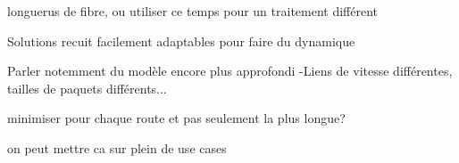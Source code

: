  longuerus de fibre, ou utiliser ce temps pour un traitement différent

Solutions recuit facilement adaptables pour faire du dynamique 

Parler notemment du modèle encore plus approfondi -Liens de vitesse différentes, tailles de paquets différents...

minimiser pour chaque route et pas seulement la plus longue?

on peut mettre ca sur plein de use cases

